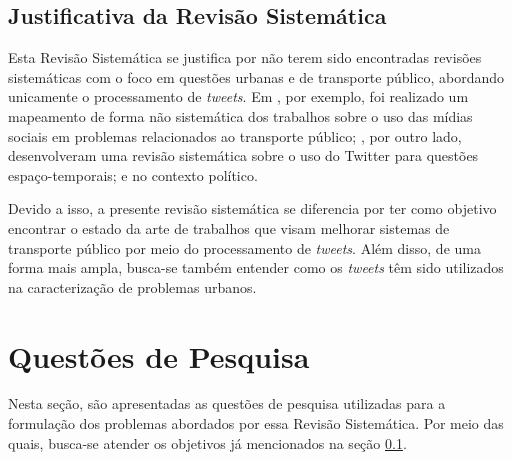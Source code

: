 \documentclass[
	12pt,				%
	oneside,			%
	a4paper,			%
	english,			%
	brazil				%
	]{abntex2ppgsi}
\begin{document}
\subsection{Justificativa da Revisão Sistemática}
\label{justificativa}
Esta Revisão Sistemática se justifica por não terem sido encontradas revisões sistemáticas com o foco em questões urbanas e de transporte público, abordando unicamente o processamento de \textit{tweets}. Em \cite{Chaniotakis2016}, por exemplo, foi realizado um mapeamento de forma não sistemática dos trabalhos sobre o uso das mídias sociais em problemas relacionados ao transporte público; \cite{steiger2015advanced}, por outro lado, desenvolveram uma revisão sistemática sobre o uso do Twitter para questões espaço-temporais; e \cite{jungherr2016twitter} no contexto político.%

Devido a isso, a presente revisão sistemática se diferencia por ter como objetivo encontrar o estado da arte de trabalhos que visam melhorar sistemas de transporte público por meio do processamento de \textit{tweets}. Além disso, de uma forma mais ampla, busca-se também entender como os \textit{tweets} têm sido utilizados na caracterização  de problemas urbanos.

\section{Questões de Pesquisa}
\label{questoes}
Nesta seção, são apresentadas as questões de pesquisa utilizadas para a formulação dos problemas abordados por essa Revisão Sistemática. Por meio das quais, busca-se atender os objetivos já mencionados na seção \ref{justificativa}.
\end{document}
